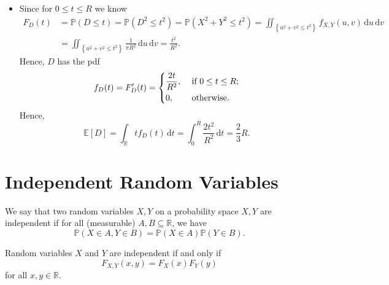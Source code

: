 \begin{explanation}
\begin{itemize}
\begin{align*}
        \end{align*} 
        Hence, \(X\) has the pdf 
        \[
            f_X(t) = \begin{dcases}
                \frac{2}{\pi R^2} \sqrt{R^2 - t^2} , &\text{ if } t \in [-R, R] ;\\
                0, &\text{ if } t \notin [-R, R]. 
            \end{dcases}
        \] 
        \item [(c)] Since for \(0 \le t \le R\) we know 
        \begin{align*}
            F_D(t) &= \mathbb{P} (D \le t) = \mathbb{P} (D^2 \le t^2) = \mathbb{P} (X^2 + Y^2 \le t^2) = \iint _{\left\{ u^2 + v^2 \le t^2 \right\} } f_{X, Y}(u, v) \, \mathrm{d} u \, \mathrm{d} v \\
            &= \iint_{\left\{ u^2 + v^2 \le t^2 \right\} } \frac{1}{\pi R^2} \, \mathrm{d} u \, \mathrm{d} v = \frac{t^2}{R^2}.    
        \end{align*}
        Hence, \(D\) has the pdf 
        \[
            f_D(t) = F_D^{\prime} (t) = \begin{dcases}
                \frac{2t}{R^2}, &\text{ if } 0 \le t \le R ;\\
                0, &\text{ otherwise}.
            \end{dcases}
        \] 
        Hence,
        \[
            \mathbb{E} [D] = \int_{\mathbb{R} } t f_D(t) \, \mathrm{d} t = \int _0^R \frac{2t^2}{R^2} \, \mathrm{d} t = \frac{2}{3}R.  
        \]
    \end{itemize}
\end{explanation}

\section{Independent Random Variables}
\begin{definition}
    We say that two random variables \(X, Y\) on a probability space \(X, Y\) are independent if for all (measurable) \( A, B \subseteq \mathbb{R}\), we have 
    \[
        \mathbb{P} (X \in A, Y \in B) = \mathbb{P} (X \in A) \mathbb{P} (Y \in B).
    \]   
\end{definition}

\begin{proposition}
Random variables \(X\) and \(Y\) are independent if and only if
\[
F_{X,Y}(x,y)=F_X(x)F_Y(y)
\]
for all \(x,y\in \mathbb{R}\).
\end{proposition}

